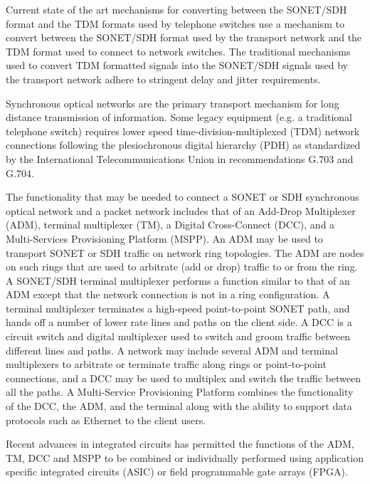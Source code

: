 \documentclass[letterpaper,final,notitlepage,twocolumn,10pt,twoside]{article}
\begin{document}
Current state of the art mechanisms for converting between the SONET/SDH
format and the TDM formats used by telephone switches use a mechanism to
convert between the SONET/SDH format used by the transport network and the TDM
format used to connect to network switches.  The traditional mechanisms used
to convert TDM formatted signals into the SONET/SDH signals used by the
transport network adhere to stringent delay and jitter requirements.

Synchronous optical networks are the primary transport mechanism for long
distance transmission of information.  Some legacy equipment (e.g. a
traditional telephone switch) requires lower speed time-division-multiplexed
(TDM) network connections following the plesiochronous digital hierarchy
(PDH) as standardized by the International Telecommunications Union in
recommendations \nocite{g703} G.703 and \nocite{g704} G.704.

The functionality that may be needed to connect a SONET or SDH synchronous
optical network and a packet network includes that of an Add-Drop Multiplexer
(ADM), terminal multiplexer (TM), a Digital Cross-Connect (DCC), and a
Multi-Services Provisioning Platform (MSPP).  An ADM may be used to transport
SONET or SDH traffic on network ring topologies.  The ADM are nodes on such
rings that are used to arbitrate (add or drop) traffic to or from the ring.  A
SONET/SDH terminal multiplexer performs a function similar to that of an ADM
except that the network connection is not in a ring configuration.  A terminal
multiplexer terminates a high-speed point-to-point SONET path, and hands off a
number of lower rate lines and paths on the client side.  A DCC is a circuit
switch and digital multiplexer used to switch and groom traffic between
different lines and paths.  A network may include several ADM and terminal
multiplexers to arbitrate or terminate traffic along rings or point-to-point
connections, and a DCC may be used to multiplex and switch the traffic between
all the paths.  A Multi-Service Provisioning Platform combines the
functionality of the DCC, the ADM, and the terminal along with the ability to
support data protocols such as Ethernet to the client users.

Recent advances in integrated circuits has permitted the functions of the ADM,
TM, DCC and MSPP to be combined or individually performed using application
specific integrated circuits (ASIC) or field programmable gate arrays (FPGA).
\end{document}

